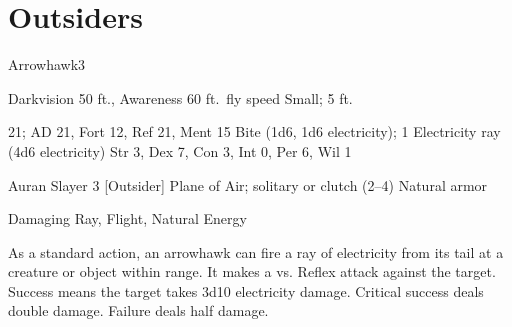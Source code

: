 \section{Outsiders}

    \begin{monsection}{Arrowhawk}{3}
        \begin{spellcontent}
            \begin{spelltargetinginfo}
                \pari {} Darkvision 50 ft., Awareness 
                \pari {} 60 ft.\ fly speed
                \pari {} Small;  5 ft.
            \end{spelltargetinginfo}
            \begin{spelleffects}
                \pari {} 21;  AD 21, Fort 12, Ref 21, Ment 15
                \pari {} Bite  (1d6, 1d6 electricity);  1
                \pari {} Electricity ray  (4d6 electricity)
                \pari {} Str 3, Dex 7, Con 3, Int 0, Per 6, Wil 1
            \end{spelleffects}
        \end{spellcontent}
        \begin{spellfooter}
            \pari {} Auran
            \pari {} Slayer 3 [Outsider]
            \pari {} Plane of Air; solitary or clutch (2--4)
            \pari {} Natural armor 
        \end{spellfooter}
    \end{monsection}
     Damaging Ray, Flight, Natural Energy

     As a standard action, an arrowhawk can fire a ray of electricity from its tail at a creature or object within \rngmed range.
    It makes a  vs. Reflex attack against the target.
    Success means the target takes 3d10 electricity damage.
    Critical success deals double damage.
    Failure deals half damage.

